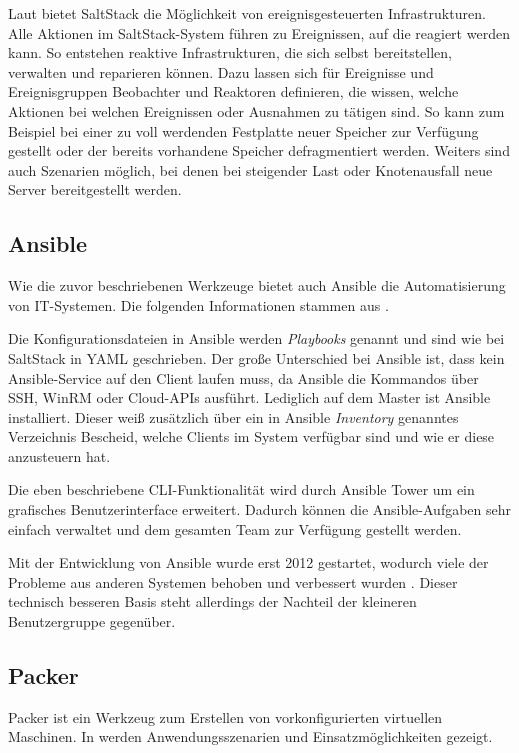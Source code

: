 Laut \autocite{SaltStack-Event:online} bietet SaltStack die Möglichkeit von ereignisgesteuerten Infrastrukturen.
Alle Aktionen im SaltStack-System führen zu Ereignissen, auf die reagiert werden kann.
So entstehen reaktive Infrastrukturen, die sich selbst bereitstellen, verwalten und reparieren können.
Dazu lassen sich für Ereignisse und Ereignisgruppen Beobachter und Reaktoren definieren, die wissen, welche Aktionen bei welchen Ereignissen oder Ausnahmen zu tätigen sind.
So kann zum Beispiel bei einer zu voll werdenden Festplatte neuer Speicher zur Verfügung gestellt oder der bereits vorhandene Speicher defragmentiert werden.
Weiters sind auch Szenarien möglich, bei denen bei steigender Last oder Knotenausfall neue Server bereitgestellt werden.

\subsection{Ansible}
\label{sub:ansible}
Wie die zuvor beschriebenen Werkzeuge bietet auch Ansible die Automatisierung von IT-Systemen.
Die folgenden Informationen stammen aus \autocite{Ansible:online}.

Die Konfigurationsdateien in Ansible werden \emph{Playbooks} genannt und sind wie bei SaltStack in YAML geschrieben.
Der große Unterschied bei Ansible ist, dass kein Ansible-Service auf den Client laufen muss, da Ansible die Kommandos über SSH, WinRM oder Cloud-APIs ausführt.
Lediglich auf dem Master ist Ansible installiert.
Dieser weiß zusätzlich über ein in Ansible \emph{Inventory} genanntes Verzeichnis Bescheid, welche Clients im System verfügbar sind und wie er diese anzusteuern hat.

Die eben beschriebene CLI-Funktionalität wird durch Ansible Tower um ein grafisches Benutzerinterface erweitert.
Dadurch können die Ansible-Aufgaben sehr einfach verwaltet und dem gesamten Team zur Verfügung gestellt werden.

Mit der Entwicklung von Ansible wurde erst 2012 gestartet, wodurch viele der Probleme aus anderen Systemen behoben und verbessert wurden \autocite{Wolff201604}. Dieser technisch besseren Basis steht allerdings der Nachteil der kleineren Benutzergruppe gegenüber.

\subsection{Packer}
\label{sub:packer}
Packer ist ein Werkzeug zum Erstellen von vorkonfigurierten virtuellen Maschinen.
In \autocite{Packer:online} werden Anwendungsszenarien und Einsatzmöglichkeiten gezeigt.

